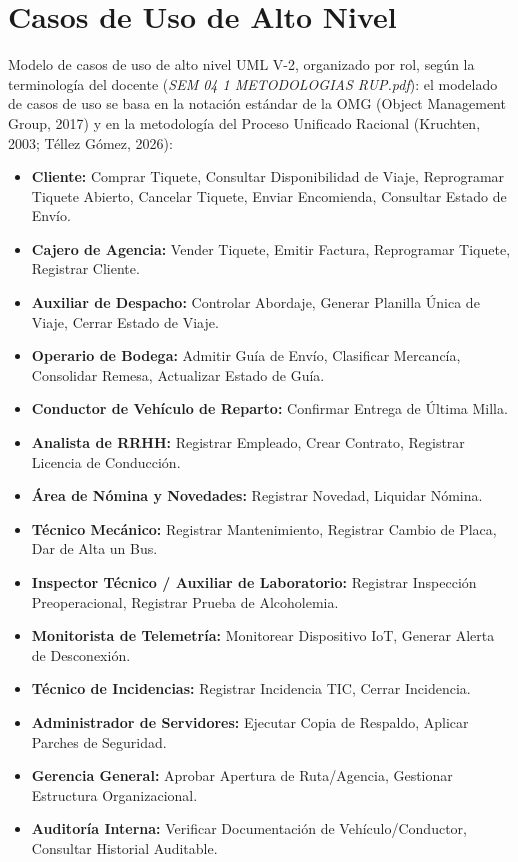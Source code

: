 \documentclass[11pt,a4paper]{article}
\begin{document}
\section{Casos de Uso de Alto Nivel}

Modelo de casos de uso de alto nivel UML V-2, organizado por rol, según la terminología del
docente (\emph{SEM 04 1 METODOLOGIAS RUP.pdf}): el modelado de casos de uso se basa en la
notación estándar de la OMG (Object Management Group, 2017) y en la metodología del Proceso
Unificado Racional (Kruchten, 2003; Téllez Gómez, 2026):

\begin{itemize}[nosep]
  \item \textbf{Cliente:} Comprar Tiquete, Consultar Disponibilidad de Viaje, Reprogramar Tiquete Abierto, Cancelar Tiquete, Enviar Encomienda, Consultar Estado de Envío.
  \item \textbf{Cajero de Agencia:} Vender Tiquete, Emitir Factura, Reprogramar Tiquete, Registrar Cliente.
  \item \textbf{Auxiliar de Despacho:} Controlar Abordaje, Generar Planilla Única de Viaje, Cerrar Estado de Viaje.
  \item \textbf{Operario de Bodega:} Admitir Guía de Envío, Clasificar Mercancía, Consolidar Remesa, Actualizar Estado de Guía.
  \item \textbf{Conductor de Vehículo de Reparto:} Confirmar Entrega de Última Milla.
  \item \textbf{Analista de RRHH:} Registrar Empleado, Crear Contrato, Registrar Licencia de Conducción.
  \item \textbf{Área de Nómina y Novedades:} Registrar Novedad, Liquidar Nómina.
  \item \textbf{Técnico Mecánico:} Registrar Mantenimiento, Registrar Cambio de Placa, Dar de Alta un Bus.
  \item \textbf{Inspector Técnico / Auxiliar de Laboratorio:} Registrar Inspección Preoperacional, Registrar Prueba de Alcoholemia.
  \item \textbf{Monitorista de Telemetría:} Monitorear Dispositivo IoT, Generar Alerta de Desconexión.
  \item \textbf{Técnico de Incidencias:} Registrar Incidencia TIC, Cerrar Incidencia.
  \item \textbf{Administrador de Servidores:} Ejecutar Copia de Respaldo, Aplicar Parches de Seguridad.
  \item \textbf{Gerencia General:} Aprobar Apertura de Ruta/Agencia, Gestionar Estructura Organizacional.
  \item \textbf{Auditoría Interna:} Verificar Documentación de Vehículo/Conductor, Consultar Historial Auditable.
\end{itemize}
\end{document}
